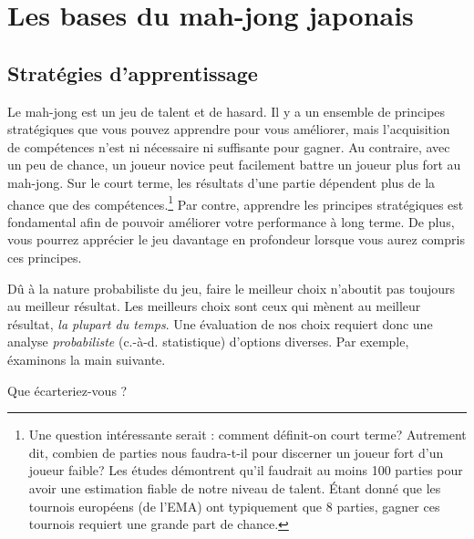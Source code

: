 \chapter{Les bases du mah-jong japonais}\label{ch:basic}
\thispagestyle{empty}

\section{Stratégies d’apprentissage}

Le mah-jong est un jeu de talent et de hasard. 
Il y a un ensemble de principes stratégiques que vous pouvez apprendre pour vous améliorer, mais l'acquisition de compétences n'est ni nécessaire ni suffisante pour gagner. Au contraire, avec un peu de chance, un joueur novice peut facilement battre un joueur plus fort au mah-jong. Sur le court terme, les résultats d'une partie dépendent plus de la chance que des compétences.\footnote{Une question intéressante serait : comment définit-on court terme? Autrement dit, combien de parties nous faudra-t-il pour discerner un joueur fort d'un joueur faible? Les études démontrent qu'il faudrait au moins 100 parties pour avoir une estimation fiable de notre niveau de talent. Étant donné que les tournois européens (de l'EMA) ont typiquement que 8 parties, gagner ces tournois requiert une grande part de chance.}
Par contre, apprendre les principes stratégiques est fondamental afin de pouvoir améliorer votre performance à long terme. De plus, vous pourrez apprécier le jeu davantage en profondeur lorsque vous aurez compris ces principes. 

\bigskip
Dû à la nature probabiliste du jeu, faire le meilleur choix n'aboutit pas toujours au meilleur résultat. Les meilleurs choix sont ceux qui mènent au meilleur résultat, \emph{la plupart du temps}. Une évaluation de nos choix requiert donc une analyse \emph{probabiliste} (c.-à-d. statistique) d'options diverses. Par exemple, éxaminons la main suivante. 
\vspace{5pt}
\begin{screen}
\bp
{}
\fa\fa\rfa
\ep
\vspace{-10pt}Que écarteriez-vous ? \vspace{-5pt}
\end{screen}

